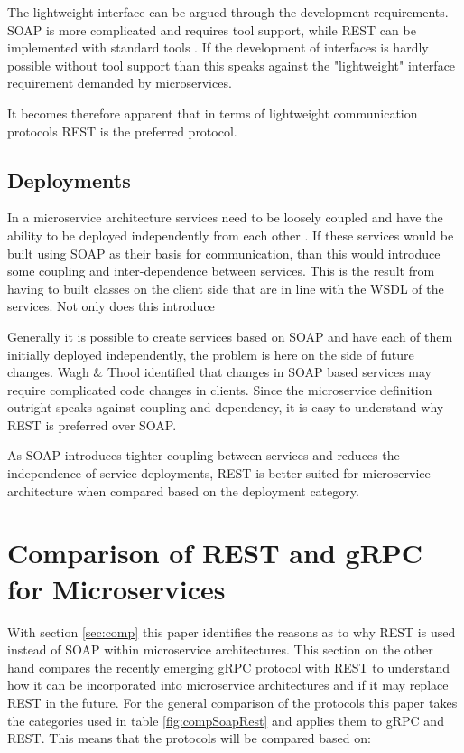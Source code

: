 \documentclass[conference]{IEEEtran}
\begin{document}
The lightweight interface can be argued through the development requirements. SOAP is more complicated and requires tool support, while REST can be implemented with standard tools \cite{wagh2012comparative}. If the development of interfaces is hardly possible without tool support than this speaks against the "lightweight" interface requirement demanded by microservices.

It becomes therefore apparent that in terms of lightweight communication protocols REST is the preferred protocol.

\subsection{Deployments}

In a microservice architecture services need to be loosely coupled and have the ability to be deployed independently from each other \cite{karmel2016nist}. If these services would be built using SOAP as their basis for communication, than this would introduce some coupling and inter-dependence between services. This is the result from having to built classes on the client side that are in line with the WSDL of the services. Not only does this introduce

Generally it is possible to create services based on SOAP and have each of them initially deployed independently, the problem is here on the side of future changes. Wagh \& Thool \cite{wagh2012comparative} identified that changes in SOAP based services may require complicated code changes in clients. Since the microservice definition outright speaks against coupling and dependency, it is easy to understand why REST is preferred over SOAP.

As SOAP introduces tighter coupling between services and reduces the independence of service deployments, REST is better suited for microservice architecture when compared based on the deployment category.  

\section{Comparison of REST and gRPC for Microservices}
\label{sec:compgrpc}

With section \ref{sec:comp} this paper identifies the reasons as to why REST is used instead of SOAP within microservice architectures. This section on the other hand compares the recently emerging gRPC protocol with REST to understand how it can be incorporated into microservice architectures and if it may replace REST in the future. For the general comparison of the protocols this paper takes the categories used in table \ref{fig:compSoapRest} and applies them to gRPC and REST. This means that the protocols will be compared based on:
\end{document}
